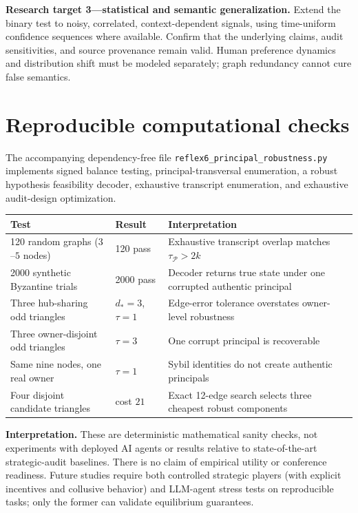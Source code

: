 \documentclass[10pt,a4paper]{article}
\theoremstyle{definition}\newtheorem{definition}[theorem]{Definition}
\newcommand{\Princ}{\mathcal P}
\begin{document}
\textbf{Research target 3---statistical and semantic generalization.} Extend the binary test to noisy, correlated, context-dependent signals, using time-uniform confidence sequences where available. Confirm that the underlying claims, audit sensitivities, and source provenance remain valid. Human preference dynamics and distribution shift must be modeled separately; graph redundancy cannot cure false semantics.

\section{Reproducible computational checks}
The accompanying dependency-free file \texttt{reflex6\_principal\_robustness.py} implements signed balance testing, principal-transversal enumeration, a robust hypothesis feasibility decoder, exhaustive transcript enumeration, and exhaustive audit-design optimization.
\begin{center}\small
\begin{tabular}{p{.41\linewidth}p{.14\linewidth}p{.33\linewidth}}\toprule
Test & Result & Interpretation\\\midrule
120 random graphs ($3$--$5$ nodes) & 120 pass & Exhaustive transcript overlap matches $\tau_{\Princ}>2k$\\
2000 synthetic Byzantine trials & 2000 pass & Decoder returns true state under one corrupted authentic principal\\
Three hub-sharing odd triangles & $d_*=3$, $\tau=1$ & Edge-error tolerance overstates owner-level robustness\\
Three owner-disjoint odd triangles & $\tau=3$ & One corrupt principal is recoverable\\
Same nine nodes, one real owner & $\tau=1$ & Sybil identities do not create authentic principals\\
Four disjoint candidate triangles & cost $21$ & Exact 12-edge search selects three cheapest robust components\\\bottomrule
\end{tabular}
\end{center}
\noindent\textbf{Interpretation.} These are deterministic mathematical sanity checks, not experiments with deployed AI agents or results relative to state-of-the-art strategic-audit baselines. There is no claim of empirical utility or conference readiness. Future studies require both controlled strategic players (with explicit incentives and collusive behavior) and LLM-agent stress tests on reproducible tasks; only the former can validate equilibrium guarantees.
\end{document}
